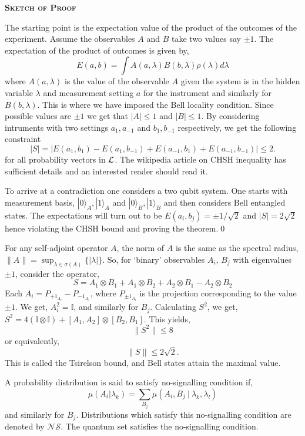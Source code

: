 \documentclass[11pt]{report}
\begin{document}
\begin{center}
	{\bfseries\textsc{Sketch of Proof}}
\end{center}
\begin{adjustwidth}{1em}{1em}
	The starting point is the expectation value of the product of the outcomes of the experiment. Assume the observables $A$ and $B$ take two values say $\pm 1$. The expectation of the product of outcomes is given by,
	$$E(a,b)=\int {A}(a,\lambda ){ {B}}(b,\lambda )\rho (\lambda )d\lambda$$
	where $A(a,\lambda)$ is the value of the observable $A$ given the system is in the hidden variable $\lambda$ and measurement setting $a$ for the instrument and similarly for $B(b,\lambda)$. This is where we have imposed the Bell locality condition. Since possible values are $\pm 1$ we get that $|A|\leq 1$ and $|B|\leq 1$. By considering intruments with two settings $a_1,a_{-1}$ and $b_1,b_{-1}$ respectively, we get the following constraint 
	$$|S|=|E(a_1,b_1)-E(a_1,b_{-1})+E(a_{-1},b_1)+E(a_{-1},b_{-1})|\leq 2.$$
	for all probability vectors in $\mathcal {L}$. The wikipedia article on CHSH inequality has sufficient details and an interested reader should read it.
	
	To arrive at a contradiction one considers a two qubit system. One starts with measurement basis, $|0\rangle_A, |1\rangle_A$ and $|0\rangle_B,|1\rangle_B$ and then considers Bell entangled states. The expectations will turn out to be $E(a_i,b_j)=\pm 1/\sqrt{2}$ and $|S|=2\sqrt{2}$ hence violating the CHSH bound and proving the theorem.\qed
\end{adjustwidth}
\vspace{1em}
For any self-adjoint operator $A$, the norm of $A$ is the same as the spectral radius, 
$\|A\|=\sup_{\lambda\in \sigma(A)}\{|\lambda|\}.$ So, for `binary' observables $A_i$, $B_j$ with eigenvalues $\pm 1$, consider the operator,
$$S=A_1\otimes B_1+A_1\otimes B_2+A_2\otimes B_1-A_2\otimes B_2$$
Each $A_i=P_{+1_{A_i}}-P_{-1_{A_i}}$, where $P_{\pm 1_{A_i}}$ is the projection corresponding to the value $\pm 1$. We get, $A_i^2=\mathbb{I}$, and similarly for $B_j$. Calculating $S^2$, we get,
$S^2=4(\mathbb{I}\otimes \mathbb{I})+[A_1,A_2]\otimes [B_2,B_1]$. This yields,
$$\|S^2\|\leq 8$$
or equivalently,
$$\|S\|\leq 2\sqrt{2}.$$
This is called the Tsirelson bound, and Bell states attain the maximal value. 

A probability distribution is said to satisfy no-signalling condition if,
$$\mu(A_i|\lambda_k)=\textstyle\sum_{B_j}\mu(A_i, B_j\:|\:\lambda_k,\lambda_l)$$
and similarly for $B_j$. Distributions which satisfy this no-signalling condition are denoted by $\mathcal{NS}$. The quantum set satisfies the no-signalling condition. 
\end{document}
